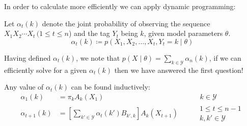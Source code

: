 \documentclass[envcountsect]{beamer}
\begin{document}
\begin{frame}
    In order to calculate more efficiently we can apply dynamic programming:
    \begin{definition}
        Let $\alpha_t(k)$ denote the joint probability of observing the sequence $X_1 X_2 \cdots X_t \, (1 \leq t \leq n$) and the tag $Y_t$ being $k$, given model parameters $\theta$.
        \begin{equation*}
            \alpha_t(k) \coloneqq p(X_1,X_2,\ldots,X_t,Y_t=k \mid \theta)
        \end{equation*}
    \end{definition}

\pause

Having defined $\alpha_t(k)$, we note that $p(X \mid \theta) = \sum_{k \in \mathcal{Y}} \alpha_n(k)$, if we can efficiently solve for a given $\alpha_t(k)$ then we have answered the first question!

\pause

\begin{definition}
Any value of $\alpha_t(k)$ can be found inductively:
\begin{align*}
    \alpha_1(k) &= \pi_{k} A_k(X_1) & \quad & \:\: k \in \mathcal{Y} \\
    \alpha_{t+1}(k) &= \left[ \sum_{k' \in \mathcal{Y}} \alpha_{t}(k')B_{k',k} \right] A_k(X_{t+1}) & \quad &
        \begin{array}{lr}
            1 \leq t \leq n-1\\
            k, k' \in \mathcal{Y}
        \end{array}
\end{align*}
\end{definition}

\end{frame}
\end{document}
